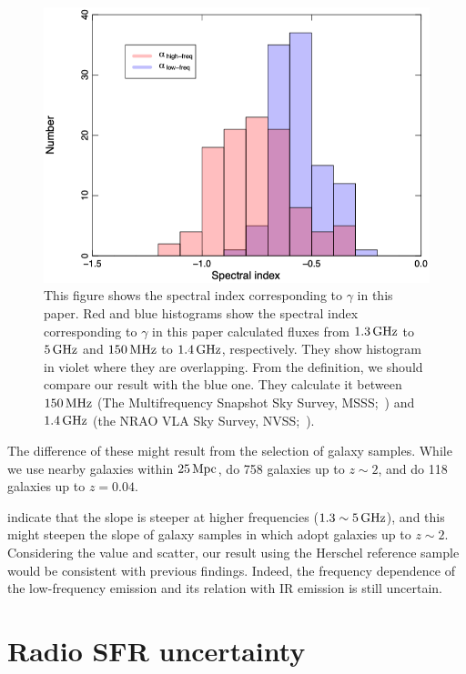\begin{figure}[htbp]
	\centering
	\includegraphics[width=.8\linewidth]{Chapter_6/Figures/Chyzy2018_Figure4.png}
    \caption[Adapted from \citet{Chyzy2018}]{\label{fig:Chyzy2018_figure4}
        This figure shows the spectral index corresponding to $\gamma$ in this paper.
        Red and blue histograms show the spectral index corresponding to $\gamma$ in this paper calculated fluxes from $1.3\,\mathrm{GHz}$ to $5\,\mathrm{GHz}$ and $150\,\mathrm{MHz}$ to $1.4\,\mathrm{GHz}$, respectively.
        They show histogram in violet where they are overlapping.
        From the definition, we should compare our result with the blue one.
        They calculate it between $150\,\mathrm{MHz}$ (The Multifrequency Snapshot Sky Survey, MSSS;~\citealt{Heald2015}) and $1.4\,\mathrm{GHz}$ (the NRAO VLA Sky Survey, NVSS;~\citealt{Condon1998}).
    }
\end{figure}

The difference of these might result from the selection of galaxy samples.
While we use nearby galaxies within $25\,\mathrm{Mpc}$, \citet{CalistroRivera2017a} do 758 galaxies up to $z\sim2$, and \citet{Chyzy2018} do 118 galaxies up to $z=0.04$.

\citet{Chyzy2018} indicate that the slope is steeper at higher frequencies ($1.3 \sim 5\,\mathrm{GHz}$), and this might steepen the slope of galaxy samples in \citet{CalistroRivera2017a} which adopt galaxies up to $z\sim2$.
Considering the value and scatter, our result using the Herschel reference sample would be consistent with previous findings.
Indeed, the frequency dependence of the low-frequency emission and its relation with IR emission is still uncertain.



\section{Radio SFR uncertainty}\label{sec:radiosfruncertainty}

